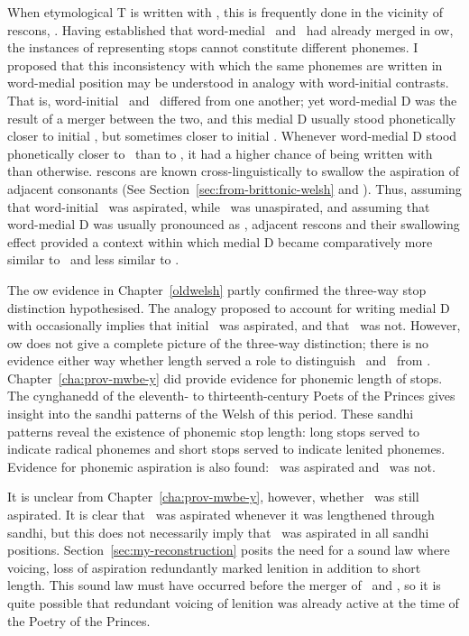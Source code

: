 When etymological \gls{T} is written with , this is frequently done in the vicinity of \gls{rescon}s, \ie {}. Having established that word-medial \xD\ and \lT\ had already merged in \gls{ow}, the instances of  representing stops cannot constitute different phonemes. I proposed that this inconsistency with which the same phonemes are written in word-medial position may be understood in analogy with word-initial contrasts. That is, word-initial \lT\ and \xD\ differed from one another; yet word-medial \gls{D} was the result of a merger between the two, and this medial \gls{D} usually stood phonetically closer to initial \lT, but sometimes closer to initial \xD. Whenever word-medial \gls{D} stood phonetically closer to \xD\ than to \lT, it had a higher chance of being written with  than otherwise. \Gls{rescon}s are known cross-linguistically to swallow the aspiration of adjacent consonants (See Section~\ref{sec:from-brittonic-welsh} and \textcite{koch_*cothairche_1990}). Thus, assuming that word-initial \lT\ was aspirated, while \xD\ was unaspirated, and assuming that word-medial \gls{D} was usually pronounced as \lT, adjacent \gls{rescon}s and their swallowing effect provided a context within which medial \gls{D} became comparatively more similar to \xD\ and less similar to \lT.

The \gls{ow} evidence in Chapter~\ref{oldwelsh} partly confirmed the three-way stop distinction hypothesised. The analogy proposed to account for writing medial \gls{D} with  occasionally implies that initial \lT\ was aspirated, and that \xD\ was not. However, \gls{ow} does not give a complete picture of the three-way distinction; there is no evidence either way whether length served a role to distinguish \xT\ and \xD\ from \lT.
Chapter~\ref{cha:prov-mwbe-y} did provide evidence for phonemic length of stops. The cynghanedd of the eleventh- to thirteenth-century Poets of the Princes gives insight into the sandhi patterns of the Welsh of this period. These sandhi patterns reveal the existence of phonemic stop length: long stops served to indicate radical phonemes and short stops served to indicate lenited phonemes. Evidence for phonemic aspiration is also found: \xT\ was aspirated and \xD\ was not.

It is unclear from Chapter~\ref{cha:prov-mwbe-y}, however, whether \lT\ was still aspirated. It is clear that \lT\ was aspirated whenever it was lengthened through sandhi, but this does not necessarily imply that \lT\ was aspirated in all sandhi positions. Section~\ref{sec:my-reconstruction} posits the need for a sound law where voicing, \ie loss of aspiration redundantly marked lenition in addition to short length. This sound law must have occurred before the merger of \lT\ and \xD, so it is quite possible that redundant voicing of lenition was already active at the time of the Poetry of the Princes.

